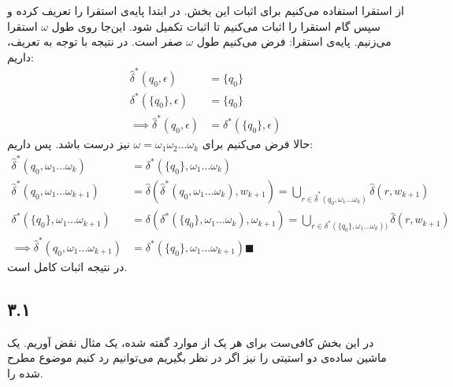 از استقرا استفاده می‌کنیم برای اثبات این بخش. در ابتدا پایه‌ی استقرا را تعریف کرده و سپس گام استقرا را اثبات می‌کنیم تا اثبات تکمیل شود. این‌جا روی طول
$\omega$
استقرا می‌زنیم.
پایه‌ی استقرا: فرض می‌کنیم طول $\omega$ صفر است. در نتیجه با توجه به تعریف، داریم:
\begin{align*}
	\hat{\delta}^{*}(q_0, \epsilon) &= \{q_0\} \\
	\delta^{*}(\{q_0\}, \epsilon) &= \{q_0\} \\
	\implies \hat{\delta}^{*}(q_0, \epsilon) &= \delta^{*}(\{q_0\}, \epsilon)
\end{align*}
حالا فرض می‌کنیم برای $\omega = \omega_1\omega_2\dots\omega_k$ نیز درست باشد. پس داریم:
\begin{align*}
	\hat{\delta}^{*}(q_0, \omega_1\dots\omega_k) &= \delta^{*}(\{q_0\}, \omega_1\dots\omega_k) \\
	\hat{\delta}^{*}(q_0, \omega_1\dots\omega_{k+1}) &= \hat{\delta}(\hat{\delta}^{*}(q_0, \omega_1 \dots \omega_{k}), w_{k + 1}) = \bigcup_{r \in \hat{\delta}^{*}(q_0, \omega_1 \dots \omega_{k})} \hat{\delta}(r, w_{k + 1})
	\\ \delta^{*}(\{q_0\}, \omega_{1}\dots\omega_{k + 1}) &= \delta(\delta^{*}(\{q_0\}, \omega_1 \dots \omega_{k}), \omega_{k+1}) = \bigcup_{r \in \delta^{*}(\{q_0\}, \omega_1 \dots \omega_{k}))} \hat{\delta}(r, w_{k + 1}) \\
	\implies \hat{\delta}^{*}(q_0, \omega_1\dots\omega_{k + 1}) &= \delta^{*}(\{q_0\}, \omega_1\dots \omega_{k+1}) \blacksquare
\end{align*}
در نتیجه اثبات کامل است.

\subsection*{۳.۱}

در این بخش کافی‌ست برای هر یک از موارد گفته شده، یک مثال نقض آوریم. یک ماشین ساده‌ی دو استیتی را نیز اگر در نظر بگیریم می‌توانیم رد کنیم موضوع مطرح شده را.

